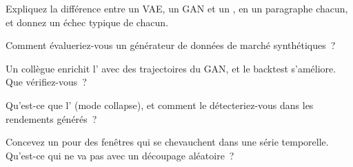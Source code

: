 \begin{interviewq}\label{iq:ml:generative-models-and-synthetic-data:2}
Expliquez la différence entre un VAE, un GAN et un , en un paragraphe chacun, et donnez un échec typique de chacun.
\end{interviewq}

\begin{interviewq}\label{iq:ml:generative-models-and-synthetic-data:3}
Comment évalueriez-vous un générateur de données de marché synthétiques~?
\end{interviewq}

\begin{interviewq}\label{iq:ml:generative-models-and-synthetic-data:4}
Un collègue enrichit l' avec des trajectoires du GAN, et le backtest s'améliore. Que vérifiez-vous~?
\end{interviewq}

\begin{interviewq}\label{iq:ml:generative-models-and-synthetic-data:5}
Qu'est-ce que l' (mode collapse), et comment le détecteriez-vous dans les rendements générés~?
\end{interviewq}

\begin{interviewq}\label{iq:ml:generative-models-and-synthetic-data:6}
Concevez un  pour des fenêtres qui se chevauchent dans une série temporelle. Qu'est-ce qui ne va pas avec un découpage aléatoire~?
\end{interviewq}
